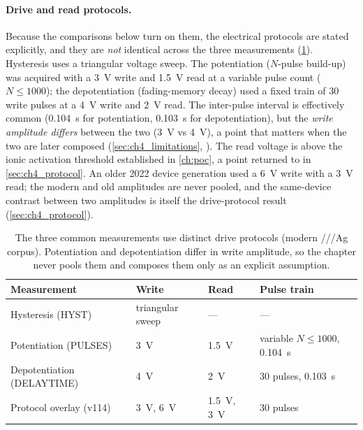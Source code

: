 \documentclass[12pt, twoside]{report}
\begin{document}
\paragraph{Drive and read protocols.} Because the comparisons below turn on them, the electrical protocols are stated explicitly, and they are \emph{not} identical across the three measurements (\cref{tab:ch4_protocols}). Hysteresis uses a triangular voltage sweep. The potentiation ($N$-pulse build-up) was acquired with a \SI{3}{\volt} write and \SI{1.5}{\volt} read at a variable pulse count ($N\le\num{1000}$); the depotentiation (fading-memory decay) used a fixed train of \num{30} write pulses at a \SI{4}{\volt} write and \SI{2}{\volt} read. The inter-pulse interval is effectively common (\SI{0.104}{\second} for potentiation, \SI{0.103}{\second} for depotentiation), but the \emph{write amplitude differs} between the two (\SI{3}{\volt} vs \SI{4}{\volt}), a point that matters when the two are later composed (\cref{sec:ch4_limitations}, ). The read voltage is above the ionic activation threshold established in \cref{ch:poc}, a point returned to in \cref{sec:ch4_protocol}. An older 2022 device generation used a \SI{6}{\volt} write with a \SI{3}{\volt} read; the modern and old amplitudes are never pooled, and the same-device contrast between two amplitudes is itself the drive-protocol result (\cref{sec:ch4_protocol}).

\begin{table}[t]
  \centering
  \caption[Electrical measurement protocols]{The three common measurements use distinct drive protocols (modern \SY{}/\PEO{}/\LiTf{}/Ag corpus). Potentiation and depotentiation differ in write amplitude, so the chapter never pools them and  composes them only as an explicit assumption.}
  \label{tab:ch4_protocols}
  {\small\setlength{\tabcolsep}{3pt}%
  \begin{tabular}{@{}lll >{\raggedright\arraybackslash}p{2.45cm}@{}}
    \toprule
    Measurement & Write & Read & Pulse train \\
    \midrule
    Hysteresis (HYST)          & triangular sweep            & ---                            & ---                                   \\
    Potentiation (PULSES)      & \SI{3}{\volt}               & \SI{1.5}{\volt}                & variable $N\le\num{1000}$, \SI{0.104}{\second} \\
    Depotentiation (DELAYTIME) & \SI{4}{\volt}               & \SI{2}{\volt}                  & \num{30} pulses, \SI{0.103}{\second}  \\
    Protocol overlay (v114)    & \SI{3}{\volt}, \SI{6}{\volt} & \SI{1.5}{\volt}, \SI{3}{\volt} & \num{30} pulses                       \\
    \bottomrule
  \end{tabular}}
\end{table}
\end{document}

